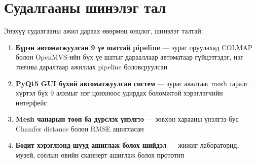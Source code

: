 \section{Судалгааны шинэлэг тал}

Энэхүү судалгааны ажил дараах өвөрмөц онцлог, шинэлэг талтай:

\begin{enumerate}
    \item \textbf{Бүрэн автоматжуулсан 9 үе шаттай pipeline} — зураг оруулахад COLMAP болон OpenMVS-ийн бүх үе шатыг дарааллаар автоматаар гүйцэтгэдэг, нэг товчны даралтаар ажиллах pipeline боловсруулсан
    \item \textbf{PyQt5 GUI бүхий автоматжуулсан систем} — зураг авалтаас mesh гаралт хүртэл бүх 9 алхмыг нэг цонхноос удирдах боломжтой хэрэглэгчийн интерфейс
    \item \textbf{Mesh чанарын тоон ба дүрслэх үнэлгээ} — зөвхөн харааны үнэлгээ бус Chamfer distance болон RMSE ашигласан
    \item \textbf{Бодит хэрэглээнд шууд ашиглаж болох шийдэл} — жижиг лабораторид, музей, соёлын өвийн сканнерт ашиглаж болох прототип
\end{enumerate}
